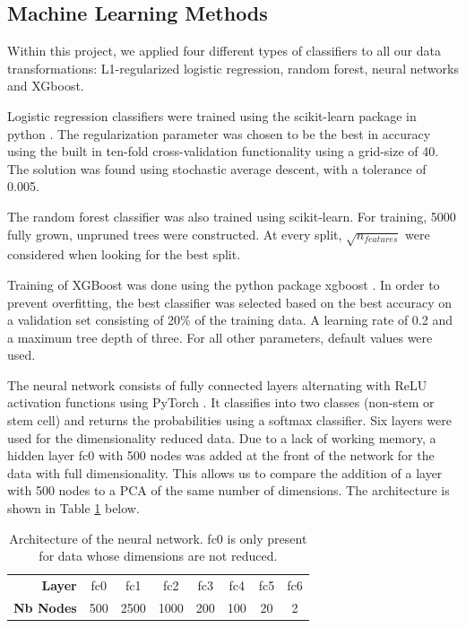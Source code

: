 \documentclass[10pt,conference,compsocconf]{IEEEtran}
\begin{document}
\subsection{Machine Learning Methods}
Within this project, we applied four different types of classifiers to all our data transformations: L1-regularized logistic regression, random forest, neural networks and XGboost.
\par
Logistic regression classifiers were trained using the scikit-learn package in python \cite{scikit-learn}. The regularization parameter was chosen to be the best in accuracy using the built in ten-fold cross-validation functionality using a grid-size of 40. The solution was found using stochastic average descent, with a tolerance of 0.005. 
\par
The random forest classifier was also trained using scikit-learn. For training, 5000 fully grown, unpruned trees were constructed. At every split, $\sqrt{n_{features}}$ were considered when looking for the best split.
\par
Training of XGBoost was done using the python package xgboost \cite{Chen:2016:XST:2939672.2939785}. In order to prevent overfitting, the best classifier was selected based on the best  accuracy on a validation set consisting of 20\% of the training data. A learning rate of 0.2 and a maximum tree depth of three. For all other parameters, default values were used.  
\par
The neural network consists of fully connected layers alternating with ReLU activation functions using PyTorch \cite{paszke2017automatic}. It classifies into two classes (non-stem or stem cell) and returns the probabilities using a softmax classifier. Six layers were used for the dimensionality reduced data. Due to a lack of working memory, a hidden layer fc0 with 500 nodes was added at the front of the network for the data with full dimensionality. This allows us to compare the addition of a layer with 500 nodes to a PCA of the same number of dimensions. The architecture is shown in Table \ref{tab:ArchitectureNN} below.

\begin{table}[H]
	\centering
	\begin{tabular}{rccccccc}
\hline
  \textbf{Layer} &  fc0 &  fc1 & fc2 & fc3 & fc4 & fc5 & fc6 \\
  \textbf{Nb Nodes} &  500 &  2500 & 1000 & 200 & 100 & 20 & 2 \\
\hline
\end{tabular}
	\caption{Architecture of the neural network. fc0 is only present for data whose dimensions are not reduced.}
	\label{tab:ArchitectureNN}
	\vspace{-8mm}
\end{table}
\end{document}
